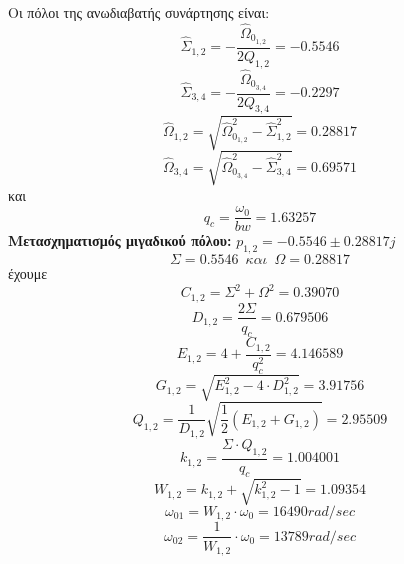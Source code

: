 \documentclass{article}
\begin{document}
{\begin{equation*}
\end{equation*}
Οι πόλοι της ανωδιαβατής συνάρτησης είναι:
\begin{equation*}
\hat{Σ}_{1,2} = - \frac{\hat{Ω}_{0_{1,2}}}{2Q_{1,2}} = -0.5546
\end{equation*}
\begin{equation*}
\hat{Σ}_{3,4} = - \frac{\hat{Ω}_{0_{3,4}}}{2Q_{3,4}} = -0.2297
\end{equation*}
\begin{equation*}
\hat{Ω}_{1,2} = \sqrt{\hat{Ω}_{0_{1,2}}^2-\hat{Σ}_{1,2}^2} = 0.28817
\end{equation*}
\begin{equation*}
\hat{Ω}_{3,4} = \sqrt{\hat{Ω}_{0_{3,4}}^2-\hat{Σ}_{3,4}^2} = 0.69571
\end{equation*}
και \\
\begin{equation*}
q_c = \frac{ω_0}{bw} = 1.63257
\end{equation*}
\textbf{Μετασχηματισμός μιγαδικού πόλου:} $p_{1,2} = -0.5546 \pm 0.28817j$ \\
\begin{equation*}
Σ = 0.5546 \enspace και \enspace Ω = 0.28817
\end{equation*}
έχουμε
\begin{equation*}
C_{1,2} = Σ^2 + Ω^2 = 0.39070
\end{equation*}
\begin{equation*}
D_{1,2} = \frac{2Σ}{q_c} = 0.679506
\end{equation*}
\begin{equation*}
E_{1,2} =4+ \frac{C_{1,2}}{q_c^2} = 4.146589
\end{equation*}
\begin{equation*}
G_{1,2} = \sqrt{E_{1,2}^2 - 4 \cdot D_{1,2}^2} = 3.91756
\end{equation*}
\begin{equation*}
Q_{1,2} = \frac{1}{D_{1,2}} \sqrt{\frac{1}{2} (E_{1,2} + G_{1,2})} = 2.95509
\end{equation*}
\begin{equation*}
k_{1,2} = \frac{Σ \cdot Q_{1,2}}{q_c} = 1.004001
\end{equation*}
\begin{equation*}
W_{1,2} = k_{1,2} + \sqrt{k_{1,2}^2 -1} = 1.09354
\end{equation*}
\begin{equation*}
ω_{01} = W_{1,2} \cdot ω_0 =  16490 rad/sec
\end{equation*}
\begin{equation*}
ω_{02} = \frac{1}{W_{1,2}} \cdot ω_0 =  13789 rad/sec
\end{equation*}

}
\end{document}
